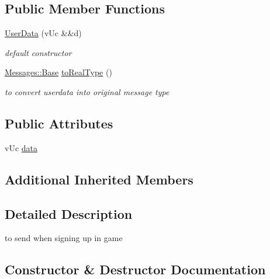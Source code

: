 \subsection*{Public Member Functions}
\begin{DoxyCompactItemize}
\item 
\hyperlink{class_network_1_1_messages_1_1_user_data_a11e780b32da44a7cb1dec0d9b812b58f}{User\+Data} (v\+Uc \&\&d)
\begin{DoxyCompactList}\small\item\em default constructor \end{DoxyCompactList}\item 
\hyperlink{class_network_1_1_messages_1_1_base}{Messages\+::\+Base} \hyperlink{class_network_1_1_messages_1_1_user_data_a4e0e98a839d043270c9fe49574bd460c}{to\+Real\+Type} ()
\begin{DoxyCompactList}\small\item\em to convert userdata into original message type \end{DoxyCompactList}\end{DoxyCompactItemize}
\subsection*{Public Attributes}
\begin{DoxyCompactItemize}
\item 
v\+Uc \hyperlink{class_network_1_1_messages_1_1_user_data_a070af8cca8899c6ff1b998a30b854d7f}{data}
\end{DoxyCompactItemize}
\subsection*{Additional Inherited Members}


\subsection{Detailed Description}
to send when signing up in game 

\subsection{Constructor \& Destructor Documentation}
\mbox{\label{class_network_1_1_messages_1_1_user_data_a11e780b32da44a7cb1dec0d9b812b58f}} 
